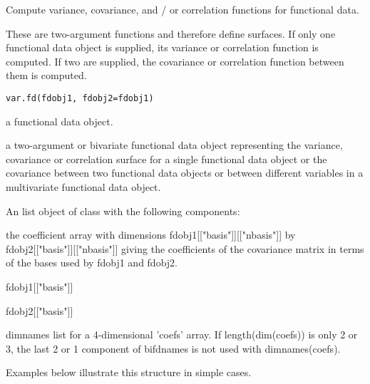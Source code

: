 \begin{Description}\relax
Compute variance, covariance, and / or correlation functions for
functional data.  

These are two-argument functions and therefore define surfaces. If
only one functional data object is supplied, its variance or
correlation function is computed.  If two are supplied, the covariance
or correlation function between them is 
computed.
\end{Description}
\begin{Usage}
\begin{verbatim}
var.fd(fdobj1, fdobj2=fdobj1)
\end{verbatim}
\end{Usage}
\begin{Arguments}
\begin{ldescription}
\item[\code{fdobj1, fdobj2}] a functional data object.

\end{ldescription}
\end{Arguments}
\begin{Details}\relax
a two-argument or bivariate functional data object representing the
variance, covariance or correlation surface for a single functional
data object or the covariance between two functional data objects or
between different variables in a multivariate functional data object.
\end{Details}
\begin{Value}
An list object of class  with the following components:

\begin{ldescription}
\item[\code{coefs}] the coefficient array with dimensions fdobj1[["basis"]][["nbasis"]]
by fdobj2[["basis"]][["nbasis"]] giving the coefficients of the 
covariance matrix in terms of the bases used by fdobj1 and
fdobj2.  

\item[\code{sbasis}] fdobj1[["basis"]]

\item[\code{tbasis}] fdobj2[["basis"]]

\item[\code{bifdnames}] dimnames list for a 4-dimensional 'coefs' array.  If
length(dim(coefs)) is only 2 or 3, the last 2 or 1 component of
bifdnames is not used with dimnames(coefs).  

\end{ldescription}


Examples below illustrate this structure in simple
cases.
\end{Value}

